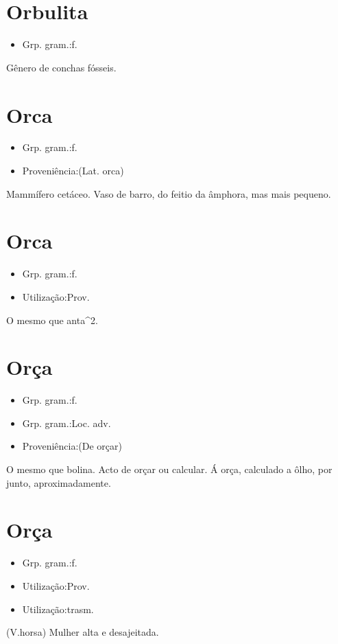 \section{Orbulita}
\begin{itemize}
\item {Grp. gram.:f.}
\end{itemize}
Gênero de conchas fósseis.
\section{Orca}
\begin{itemize}
\item {Grp. gram.:f.}
\end{itemize}
\begin{itemize}
\item {Proveniência:(Lat. \textunderscore orca\textunderscore )}
\end{itemize}
Mammífero cetáceo.
Vaso de barro, do feitio da âmphora, mas mais pequeno.
\section{Orca}
\begin{itemize}
\item {Grp. gram.:f.}
\end{itemize}
\begin{itemize}
\item {Utilização:Prov.}
\end{itemize}
O mesmo que \textunderscore anta\textunderscore ^2.
\section{Orça}
\begin{itemize}
\item {Grp. gram.:f.}
\end{itemize}
\begin{itemize}
\item {Grp. gram.:Loc. adv.}
\end{itemize}
\begin{itemize}
\item {Proveniência:(De \textunderscore orçar\textunderscore )}
\end{itemize}
O mesmo que \textunderscore bolina\textunderscore .
Acto de orçar ou calcular.
\textunderscore Á orça\textunderscore , calculado a ôlho, por junto, aproximadamente.
\section{Orça}
\begin{itemize}
\item {Grp. gram.:f.}
\end{itemize}
\begin{itemize}
\item {Utilização:Prov.}
\end{itemize}
\begin{itemize}
\item {Utilização:trasm.}
\end{itemize}
(V.horsa)
Mulher alta e desajeitada.
